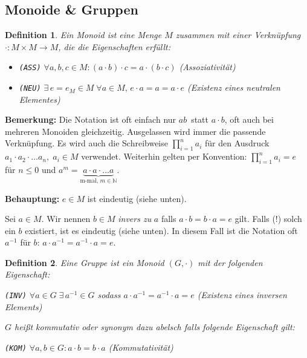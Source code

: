 \documentclass[10pt,a4paper]{article}
\newtheorem{defi}{Definition}
\begin{document}
\subsection{Monoide \& Gruppen}

\begin{defi}
	Ein \emph{Monoid} ist eine Menge $M$ zusammen mit einer Verknüpfung $\cdot : M \times M \to M$,
	die die Eigenschaften erfüllt:
	\begin{itemize}
		\item \emph{\texttt{(ASS)}} $\forall a,b,c \in M: (a \cdot b) \cdot c = a \cdot (b \cdot c)$ (Assoziativität)
		\item \emph{\texttt{(NEU)}} $\exists\, e = e_M \in M \; \forall a \in M,\, e \cdot a = a = a \cdot e$ (Existenz
	eines neutralen Elementes)
	\end{itemize} 
\end{defi}

\textbf{Bemerkung:} Die Notation ist oft einfach nur \glqq $ab$\grqq\ statt \glqq $a \cdot b$\grqq , oft auch bei mehreren Monoiden gleichzeitig. Ausgelassen wird immer die passende Verknüpfung. Es wird auch die Schreibweise $\prod_{i=1}^{n} a_i$ für den Ausdruck $a_1 \cdot a_2 \cdot \dots a_n,\; a_i \in M$ verwendet. Weiterhin gelten per Konvention: $\prod_{i=1}^{n} a_i = e$ für $n \leq 0$ und $a^m = \underbrace{a \cdot a \cdot \dots a}_{\text{m-mal, } m \in \mathbb{N}}$.

\textbf{Behauptung:} $e \in M$ ist eindeutig (siehe unten).\bigskip

Sei $a \in M$. Wir nennen $b \in M$ \emph{invers zu} $a$ falls $a \cdot b = b \cdot a = e$ gilt. Falls (!) solch ein $b$ existiert, ist es eindeutig (siehe unten). In diesem Fall ist die Notation oft $a^{-1}$ für $b$: $a \cdot a^{-1} = a^{-1} \cdot a = e$.\bigskip

\begin{defi} Eine \emph{Gruppe} ist ein Monoid $(G, \cdot)$ mit der folgenden Eigenschaft: 

\begin{center}
\emph{\texttt{(INV)}} $\forall a \in G\; \exists\, a^{-1} \in G$ sodass $a \cdot a^{-1} = a^{-1} \cdot a = e$ (Existenz eines inversen Elements)
\end{center}
$G$ heißt \emph{kommutativ} oder synonym dazu \emph{abelsch} falls folgende Eigenschaft gilt:
\begin{center}
\emph{\texttt{(KOM)}} $\forall a, b \in G: a \cdot b = b \cdot a$ (Kommutativität)
\end{center}
\end{defi}
\end{document}
